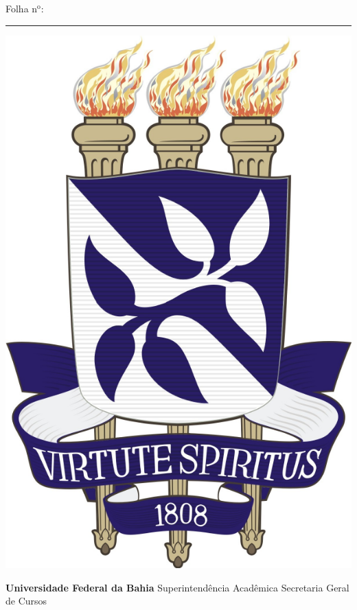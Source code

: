 \documentclass[10pt]{scrartcl}
\begin{document}
\sloppy
{}
\begin{center}
\hfill Folha n$^\text{o}$: \rule{1cm}{0.4pt}

	\begin{minipage}{0.06\textwidth}
	\includegraphics[width=\textwidth]{brasaoufba} 
	\end{minipage} 
	\begin{minipage}{6cm}
	\centering
	\textbf{Universidade Federal da Bahia}\newline
	Superintendência Acadêmica\newline
	Secretaria Geral de Cursos
	\end{minipage} 
	\begin{minipage}{0.08\textwidth}

\end{minipage}
\end{center}
\end{document}

